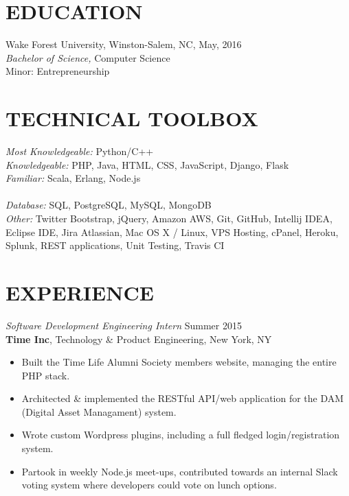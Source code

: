 \documentclass[margin]{res}
\begin{document}
\begin{resume}


\section{EDUCATION}

Wake Forest University, Winston-Salem, NC, May, 2016 \\
{\sl Bachelor of Science,} Computer Science \\
Minor: Entrepreneurship 
 

\section{TECHNICAL TOOLBOX} 

{\sl Most Knowledgeable:} Python/C++ \\
{\sl Knowledgeable:} PHP, Java, HTML, CSS, JavaScript, Django, Flask \\
{\sl Familiar:} Scala, Erlang, Node.js\\ \\
{\sl Database:} SQL, PostgreSQL, MySQL, MongoDB \\
{\sl Other:} Twitter Bootstrap, jQuery, Amazon AWS, Git, GitHub, Intellij IDEA, Eclipse IDE, Jira Atlassian, Mac OS X / Linux, VPS Hosting, cPanel, Heroku, Splunk, REST applications, Unit Testing, Travis CI
 
 
\section{EXPERIENCE}

{\sl Software Development Engineering Intern} \hfill Summer 2015 \\
\textbf{Time Inc}, Technology \& Product Engineering, New York, NY
\begin{itemize} \itemsep -2pt %
\item Built the Time Life Alumni Society members website, managing the entire PHP stack.
\item Architected \& implemented the RESTful API/web application for the DAM (Digital Asset Managament) system.
\item Wrote custom Wordpress plugins, including a full fledged login/registration system.
\item Partook in weekly Node.js meet-ups, contributed towards an internal Slack voting system where developers could vote on lunch options.
\end{itemize}


\end{resume}
\end{document}
